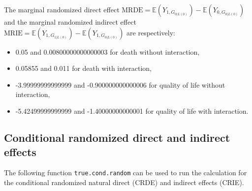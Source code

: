 \documentclass[
]{book}
\providecommand{\tightlist}{%
  \setlength{\itemsep}{0pt}\setlength{\parskip}{0pt}}
\begin{document}
The marginal randomized direct effect \(\text{MRDE}=\mathbb{E}\left(Y_{1,G_{0|L(0)}}\right) - \mathbb{E}\left(Y_{0,G_{0|L(0)}}\right)\) and the marginal randomized indirect effect \(\text{MRIE}=\mathbb{E}\left(Y_{1,G_{1|L(0)}}\right) - \mathbb{E}\left(Y_{1,G_{0|L(0)}}\right)\) are respectively:

\begin{itemize}
\tightlist
\item
  0.05 and 0.00800000000000003 for death without interaction,
\item
  0.05855 and 0.011 for death with interaction,
\item
  -3.99999999999999 and -0.900000000000006 for quality of life without interaction,
\item
  -5.42499999999999 and -1.40000000000001 for quality of life with interaction.
\end{itemize}

\hypertarget{conditional-randomized-direct-and-indirect-effects}{%
\subsection{Conditional randomized direct and indirect effects}\label{conditional-randomized-direct-and-indirect-effects}}

The following function \texttt{true.cond.random} can be used to run the calculation for the conditional randomized natural direct (CRDE) and indirect effects (CRIE).
\end{document}
